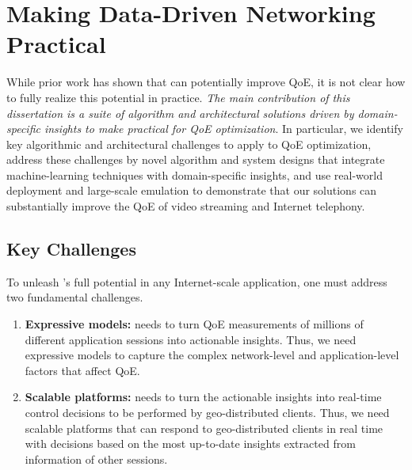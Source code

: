 \section{Making Data-Driven Networking Practical}

While prior work has shown that \ddn can potentially improve QoE, it is not 
clear how to fully realize this potential in practice.
{\em The main contribution of this dissertation is a suite of algorithm and 
architectural solutions driven by domain-specific insights
to make \ddn practical for QoE optimization}. In particular, 
we identify key algorithmic and architectural challenges to apply \ddn to 
QoE optimization, address these challenges by novel algorithm and system 
designs that integrate machine-learning techniques with domain-specific  insights,
and use real-world deployment and large-scale 
emulation to demonstrate that our solutions can substantially improve 
the QoE of video streaming and Internet telephony.

\subsection{Key Challenges}
To unleash \ddn's full potential in any Internet-scale application, 
one must address two fundamental challenges.

\begin{enumerate}

\item 
{\bf Expressive models:} 
\ddn needs to turn QoE measurements of millions of 
different application sessions into actionable insights.
Thus, we need expressive models to capture the complex network-level and 
application-level factors that affect QoE. 

\item 
{\bf Scalable platforms:}
\ddn needs to turn the actionable insights into 
real-time control decisions to be performed by
geo-distributed clients. 
Thus, we need scalable platforms that can respond to geo-distributed 
clients in real time with decisions based on the most up-to-date insights 
extracted from information of other sessions.

\end{enumerate}



